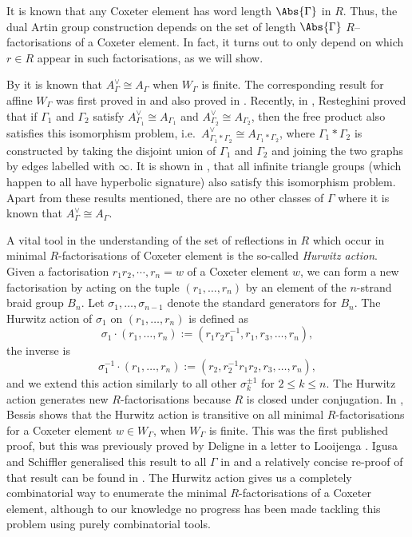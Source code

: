 It is known that any Coxeter element has word length $\Abs{\Gamma}$ in $R$.
Thus, the dual Artin group construction depends on the set of length $\Abs{\Gamma}$ $R$--factorisations of  a Coxeter element.
In fact, it turns out to only depend on which $r \in R$ appear in such factorisations, as we will show.

By \cite{bessis_dual_2003, brady_watt_kp_2002} it is known that $A^\vee_\Gamma \cong A_\Gamma$ when $W_\Gamma$ is finite.
The corresponding result for affine $W_\Gamma$ was first proved in \cite{mccammond_sulway_artin_2017} and also proved in \cite{paolini_salvetti_kpi1_2021}.
Recently, in \cite{resteghini_free_2024}, Resteghini proved that if $\Gamma_1$ and  $\Gamma_2$ satisfy $A^\vee_{\Gamma_1} \cong A_{\Gamma_1}$ and $A^\vee_{\Gamma_2}\cong A_{\Gamma_2}$, then the free product also satisfies this isomorphism problem, i.e.~$A^\vee_{\Gamma_1 \ast \Gamma_2} \cong A_{\Gamma_1\ast \Gamma_2}$, where $\Gamma_1 \ast \Gamma_2$ is constructed by taking the disjoint union of $\Gamma_1$ and  $\Gamma_2$ and joining the two graphs by edges labelled with $\infty$.
It is shown in \cite{delucchi_etal_dual_2024}, that all infinite triangle groups (which happen to all have hyperbolic signature) also satisfy this isomorphism problem.
Apart from these results mentioned, there are no other classes of $\Gamma$ where it is known that $A^\vee_\Gamma \cong A_\Gamma$.

A vital tool in the understanding of the set of reflections in $R$ which occur in minimal $R$-factorisations of Coxeter element is the so-called \emph{Hurwitz action}.
Given a factorisation $r_1r_2, \cdots ,r_n=w$ of a Coxeter element $w$, we can form a new factorisation by acting on the tuple  $(r_1, \ldots, r_n)$ by an element of the $n$-strand braid group  $B_n$.
Let  $\sigma_1, \ldots , \sigma_{n-1}$ denote the standard generators for $B_n$.
The Hurwitz action of  $\sigma_1$ on  $(r_1, \ldots, r_n)$ is defined as
\[
	\sigma_1 \cdot (r_1, \ldots, r_n) := (r_1r_2r_1^{-1}, r_1, r_3, \ldots, r_n)
	,\]
the inverse is
\[
	\sigma_1^{-1} \cdot (r_1, \ldots, r_n) := (r_2, r_2^{-1}r_1r_2, r_3, \ldots, r_n)
	,\]
and we extend this action similarly to all other $\sigma_k^{\pm 1}$ for  $2\leq k \leq n$.
The Hurwitz action generates new  $R$-factorisations because  $R$ is closed under conjugation.
In \cite{bessis_dual_2003}, Bessis shows that the Hurwitz action is transitive on all minimal  $R$-factorisations for a Coxeter element  $w \in W_\Gamma$, when  $W_\Gamma$ is finite.
This was the first published proof, but this was previously proved by Deligne in a letter to Looijenga \cite{deligne_letter_1974}.
Igusa and Schiffler generalised this result to all $\Gamma$ in \cite{igusa_schiffler_exceptional_2010} and a relatively concise re-proof of that result can be found in \cite{baumeister_etal_note_2014}.
The Hurwitz action gives us a completely combinatorial way to enumerate the minimal $R$-factorisations of a Coxeter element, although to our knowledge no progress has been made tackling this problem using purely combinatorial tools.

